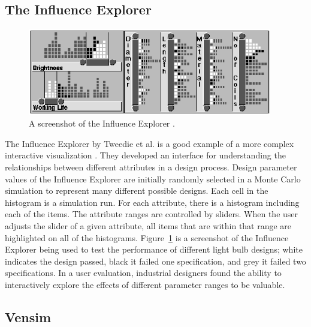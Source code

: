 \subsection{The Influence Explorer}

\begin{figure}[h]
	\centering
	\includegraphics[width=0.95\textwidth]{figures/png/influenceExplorer.png}
	\caption{A screenshot of the Influence Explorer \cite{tweedie1995}.}
	\label{fig:influenceExplorer}
\end{figure}

The Influence Explorer by Tweedie et al. is a good example of a more complex interactive visualization \citeyearpar{tweedie1995}.  They developed an interface for understanding the relationships between different attributes in a design process.  Design parameter values of the Influence Explorer are initially randomly selected in a Monte Carlo simulation to represent many different possible designs.  Each cell in the histogram is a simulation run.  For each attribute, there is a histogram including each of the items.  The attribute ranges are controlled by sliders.  When the user adjusts the slider of a given attribute, all items that are within that range are highlighted on all of the histograms.  Figure~\ref{fig:influenceExplorer} is a screenshot of the Influence Explorer being used to test the performance of different light bulb designs; white indicates the design passed, black it failed one specification, and grey it failed two specifications.  In a user evaluation, industrial designers found the ability to interactively explore the effects of different parameter ranges to be valuable.

\subsection{Vensim}

